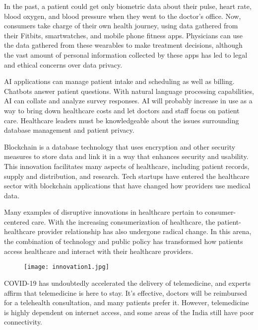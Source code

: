 \documentclass[12pt,a4paper]{report}
\begin{document}
In the past, a patient could get only biometric data about their pulse, heart rate, blood oxygen, and blood pressure when they went to the doctor’s office. Now, consumers take charge of their own health journey, using data gathered from their Fitbits, smartwatches, and mobile phone fitness apps. Physicians can use the data gathered from these wearables to make treatment decisions, although the vast amount of personal information collected by these apps has led to legal and ethical concerns over data privacy.\par

AI applications can manage patient intake and scheduling as well as billing. Chatbots answer patient questions. With natural language processing capabilities, AI can collate and analyze survey responses. AI will probably increase in use as a way to bring down healthcare costs and let doctors and staff focus on patient care. Healthcare leaders must be knowledgeable about the issues surrounding database management and patient privacy. \par

Blockchain is a database technology that uses encryption and other security measures to store data and link it in a way that enhances security and usability. This innovation facilitates many aspects of healthcare, including patient records, supply and distribution, and research. Tech startups have entered the healthcare sector with blockchain applications that have changed how providers use medical data.\par

Many examples of disruptive innovations in healthcare pertain to consumer-centered care. With the increasing consumerization of healthcare, the patient-healthcare provider relationship has also undergone radical change. In this arena, the combination of technology and public policy has transformed how patients access healthcare and interact with their healthcare providers.\par



\begin{figure}
    \centering
    \texttt{[image: innovation1.jpg]}
\end{figure}

COVID-19 has undoubtedly accelerated the delivery of telemedicine, and experts affirm that telemedicine is here to stay. It’s effective, doctors will be reimbursed for a telehealth consultation, and many patients prefer it. However, telemedicine is highly dependent on internet access, and some areas of the India still have poor connectivity.\par
\end{document}
